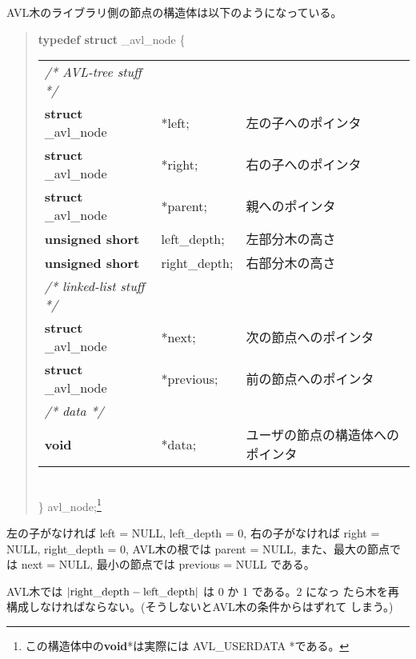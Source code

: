 AVL木のライブラリ側の節点の構造体は以下のようになっている。

\begin{quote}
{\bf typedef struct} \_avl\_node \{\\
\hspace*{1cm}
\begin{tabular}{lll}
{\it /* AVL-tree stuff */}&&\\
{\bf struct} \_avl\_node	&*left;		&左の子へのポインタ\\
{\bf struct} \_avl\_node	&*right;	&右の子へのポインタ\\
{\bf struct} \_avl\_node	&*parent;	&親へのポインタ\\
{\bf unsigned short}		&left\_depth;	&左部分木の高さ\\
{\bf unsigned short}		&right\_depth;	&右部分木の高さ\\
{\it /* linked-list stuff */}&&\\
{\bf struct} \_avl\_node	&*next;		&次の節点へのポインタ\\
{\bf struct} \_avl\_node	&*previous;	&前の節点へのポインタ\\
{\it /* data */}&&\\
{\bf void}	       		&*data;		&ユーザの節点の構造体へのポインタ\\
\end{tabular}\\
\} avl\_node;\footnote{この構造体中の{\bf void}*は実際には
AVL\_USERDATA *である。}
\end{quote}
左の子がなければ left = NULL, left\_depth = 0, 右の子がなければ right =
NULL, right\_depth = 0, AVL木の根では parent = NULL, また、最大の節点で
は next = NULL, 最小の節点では previous = NULL である。

AVL木では $|\rm right\_depth - left\_depth |$ は 0 か 1 である。2 になっ
たら木を再構成しなければならない。(そうしないとAVL木の条件からはずれて
しまう。)

